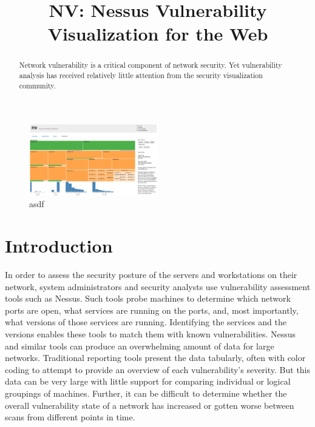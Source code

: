\documentclass{acm_proc_article-sp}
\begin{document}
\title{NV: Nessus Vulnerability Visualization for the Web}


\author{
}

\maketitle
\begin{abstract}

Network vulnerability is a critical component of network security. 
Yet vulnerability analysis has received relatively little attention from the security visualization community.  

\end{abstract}




\begin{figure}
  \centering
  \includegraphics[width=0.5\textwidth]{../screenshots/overview}
  \caption{asdf}
\end{figure}

\section{Introduction}
In order to assess the security posture of the servers and workstations on their network, system administrators and security analysts use vulnerability assessment tools such as Nessus. Such tools probe machines to determine which network ports are open, what services are running on the ports, and, most importantly, what versions of those services are running. Identifying the services and the versions enables these tools to match them with known vulnerabilities. Nessus and similar tools can produce an overwhelming amount of data for large networks. Traditional reporting tools present the data tabularly, often with color coding to attempt to provide an overview of each vulnerability's severity. But this data can be very large with little support for comparing individual or logical groupings of machines. Further, it can be difficult to determine whether the overall vulnerability state of a network has increased or gotten worse between scans from different points in time.
\end{document}
